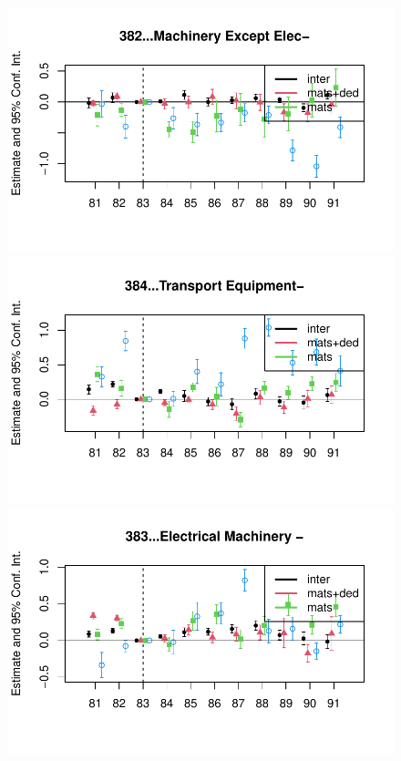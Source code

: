 \documentclass[
  12pt]{article}
\theoremstyle{definition}
\theoremstyle{remark}
\begin{document}
\begin{figure}
\begin{minipage}{\linewidth}
\includegraphics{Tax-Prod_files/figure-pdf/unnamed-chunk-11-4.pdf}

\includegraphics{Tax-Prod_files/figure-pdf/unnamed-chunk-11-5.pdf}

\includegraphics{Tax-Prod_files/figure-pdf/unnamed-chunk-11-6.pdf}


\end{minipage}
\end{figure}
\end{document}
